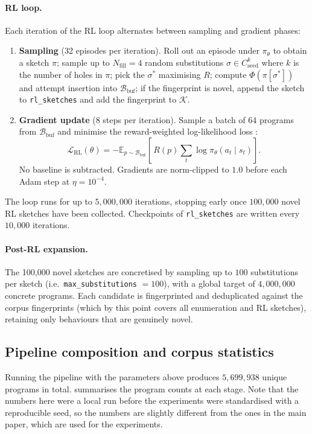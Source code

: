 \documentclass[12pt]{article}
\begin{document}
\paragraph{RL loop.} Each iteration of the RL loop alternates between sampling and gradient phases:
\begin{enumerate}
  \item \textbf{Sampling} (32 episodes per iteration). Roll out an episode under $\pi_\theta$ to obtain a sketch $\pi$; sample up to $N_{\mathrm{fill}} = 4$ random substitutions $\sigma \in C_{\mathrm{seed}}^k$ where $k$ is the number of holes in $\pi$; pick the $\sigma^*$ maximising $R$; compute $\Phi(\pi[\sigma^*])$ and attempt insertion into $\mathcal{B}_{\mathrm{buf}}$; if the fingerprint is novel, append the sketch to \texttt{rl\_sketches} and add the fingerprint to $\mathcal{K}$.
  \item \textbf{Gradient update} (8 steps per iteration). Sample a batch of $64$ programs from $\mathcal{B}_{\mathrm{buf}}$ and minimise the reward-weighted log-likelihood loss \citep{abolafia2018priority}:
  \[
    \mathcal{L}_{\mathrm{RL}}(\theta) = -\mathbb{E}_{p \sim \mathcal{B}_{\mathrm{buf}}}\!\left[\,R(p)\sum_t \log \pi_\theta(a_t \mid s_t)\right].
  \]
  No baseline is subtracted. Gradients are norm-clipped to $1.0$ before each Adam step at $\eta = 10^{-4}$.
\end{enumerate}
The loop runs for up to $5{,}000{,}000$ iterations, stopping early once $100{,}000$ novel RL sketches have been collected. Checkpoints of \texttt{rl\_sketches} are written every $10{,}000$ iterations.

\paragraph{Post-RL expansion.} The 100{,}000 novel sketches are concretised by sampling up to $100$ substitutions per sketch (i.e.\ \texttt{max\_substitutions} $= 100$), with a global target of $4{,}000{,}000$ concrete programs. Each candidate is fingerprinted and deduplicated against the corpus fingerprints (which by this point covers all enumeration and RL sketches), retaining only behaviours that are genuinely novel.

\subsection{Pipeline composition and corpus statistics}\label{app:pipeline}

Running the pipeline with the parameters above produces $5{,}699{,}938$ unique programs in total.  summarises the program counts at each stage. Note that the numbers here were a local run before the experiments were standardised with a reproducible seed, so the numbers are slightly different from the ones in the main paper, which are used for the experiments.
\end{document}
